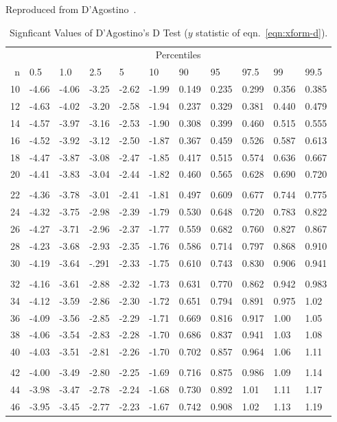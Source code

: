 \documentclass[draft]{article}
\begin{document}
\begin{table}
\caption{Signficant Values of D'Agostino's D Test (\(y\) statistic
of eqn.~\protect\ref{eqn:xform-d}).}
\centerline{Reproduced from D'Agostino~\protect\cite{dagostino86}.}
\label{tbl:d-test}
\scriptsize
\begin{center}
\begin{tabular}{rllllllllll}\hline
& \multicolumn{10}{c}{Percentiles} \\ \cline{2-11}
n & 0.5 & 1.0 & 2.5 & 5 & 10 & 90 & 95 & 97.5 & 99 & 99.5 \\ \hline
10&-4.66&-4.06&-3.25&-2.62&-1.99&0.149&0.235&0.299&0.356&0.385\\
12&-4.63&-4.02&-3.20&-2.58&-1.94&0.237&0.329&0.381&0.440&0.479\\
14&-4.57&-3.97&-3.16&-2.53&-1.90&0.308&0.399&0.460&0.515&0.555\\
16&-4.52&-3.92&-3.12&-2.50&-1.87&0.367&0.459&0.526&0.587&0.613\\
18&-4.47&-3.87&-3.08&-2.47&-1.85&0.417&0.515&0.574&0.636&0.667\\
20&-4.41&-3.83&-3.04&-2.44&-1.82&0.460&0.565&0.628&0.690&0.720\\
\\
22&-4.36&-3.78&-3.01&-2.41&-1.81&0.497&0.609&0.677&0.744&0.775\\
24&-4.32&-3.75&-2.98&-2.39&-1.79&0.530&0.648&0.720&0.783&0.822\\
26&-4.27&-3.71&-2.96&-2.37&-1.77&0.559&0.682&0.760&0.827&0.867\\
28&-4.23&-3.68&-2.93&-2.35&-1.76&0.586&0.714&0.797&0.868&0.910\\
30&-4.19&-3.64&-.291&-2.33&-1.75&0.610&0.743&0.830&0.906&0.941\\
\\
32&-4.16&-3.61&-2.88&-2.32&-1.73&0.631&0.770&0.862&0.942&0.983\\
34&-4.12&-3.59&-2.86&-2.30&-1.72&0.651&0.794&0.891&0.975&1.02\\
36&-4.09&-3.56&-2.85&-2.29&-1.71&0.669&0.816&0.917&1.00&1.05\\
38&-4.06&-3.54&-2.83&-2.28&-1.70&0.686&0.837&0.941&1.03&1.08\\
40&-4.03&-3.51&-2.81&-2.26&-1.70&0.702&0.857&0.964&1.06&1.11\\
\\
42&-4.00&-3.49&-2.80&-2.25&-1.69&0.716&0.875&0.986&1.09&1.14\\
44&-3.98&-3.47&-2.78&-2.24&-1.68&0.730&0.892&1.01&1.11&1.17\\
46&-3.95&-3.45&-2.77&-2.23&-1.67&0.742&0.908&1.02&1.13&1.19\\

\end{tabular}
\end{center}
\end{table}
\end{document}
